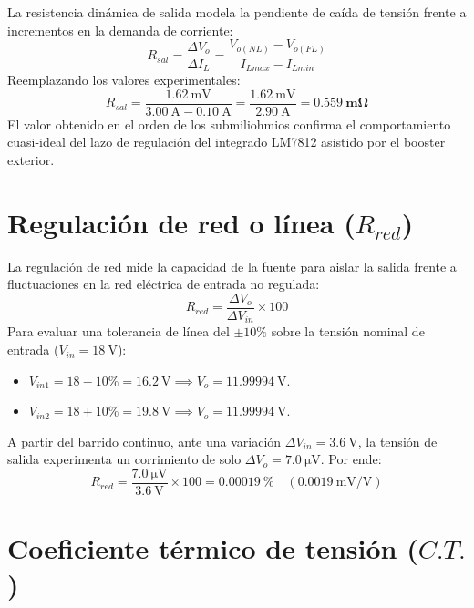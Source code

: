 La resistencia dinámica de salida modela la pendiente de caída de tensión frente a incrementos en la demanda
de corriente:
\begin{equation*}
    R_{sal} = \frac{\Delta V_o}{\Delta I_L} = \frac{V_{o(NL)} - V_{o(FL)}}{I_{Lmax} - I_{Lmin}}
\end{equation*}
Reemplazando los valores experimentales:
\begin{equation*}
    R_{sal} = \frac{\SI{1.62}{\milli\volt}}{\SI{3.00}{\ampere} - \SI{0.10}{\ampere}}
            = \frac{\SI{1.62}{\milli\volt}}{\SI{2.90}{\ampere}}
            = \mathbf{\SI{0.559}{\milli\ohm}}
\end{equation*}
El valor obtenido en el orden de los submiliohmios confirma el comportamiento cuasi-ideal del lazo de regulación
del integrado LM7812 asistido por el booster exterior.

\section{Regulación de red o línea ($R_{red}$)}
\label{sec.c5:rred}

La regulación de red mide la capacidad de la fuente para aislar la salida frente a fluctuaciones en la red eléctrica
de entrada no regulada:
\begin{equation*}
    R_{red} = \frac{\Delta V_o}{\Delta V_{in}} \times 100
\end{equation*}
Para evaluar una tolerancia de línea del $\pm 10\%$ sobre la tensión nominal de entrada ($V_{in} = \SI{18}{\volt}$):
\begin{itemize}
    \item $V_{in1} = 18 - 10\% = \SI{16.2}{\volt} \implies V_o = \SI{11.99994}{\volt}$.
    \item $V_{in2} = 18 + 10\% = \SI{19.8}{\volt} \implies V_o = \SI{11.99994}{\volt}$.
\end{itemize}
A partir del barrido continuo, ante una variación
$\Delta V_{in} = \SI{3.6}{\volt}$, la tensión de salida experimenta un corrimiento de solo
$\Delta V_o = \SI{7.0}{\micro\volt}$. Por ende:
\begin{equation*}
    R_{red} = \frac{\SI{7.0}{\micro\volt}}{\SI{3.6}{\volt}} \times 100 = \mathbf{\SI{0.00019}{\percent}}
    \quad \left(\SI{0.0019}{\milli\volt/\volt}\right)
\end{equation*}

\section{Coeficiente térmico de tensión ($C.T.$)}
\label{sec.c5:ct}

